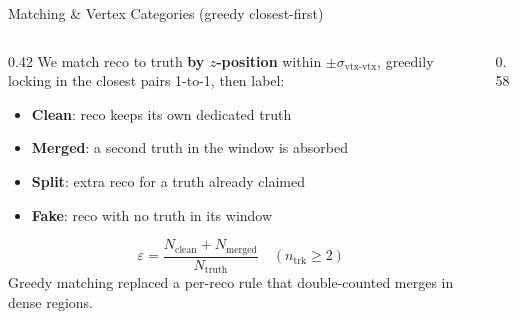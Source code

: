 \documentclass[xcolor=table,aspectratio=169]{beamer}
\newcommand{\ntrk}{\ensuremath{n_\mathrm{trk}}}
\begin{document}
\begin{frame}{Matching \& Vertex Categories (greedy closest-first)}
    \begin{columns}[c]
        \begin{column}{0.42\linewidth}
            \footnotesize
            We match reco to truth \textbf{by $z$-position} within $\pm\sigma_{\text{vtx-vtx}}$,
            greedily locking in the closest pairs 1-to-1, then label:
            \begin{itemize}\setlength\itemsep{0.35em}
                \item \textcolor{mygreen!70!black}{\textbf{Clean}}: reco keeps its own dedicated truth
                \item \textcolor{myorange!85!black}{\textbf{Merged}}: a second truth in the window is absorbed
                \item \textcolor{myblue}{\textbf{Split}}: extra reco for a truth already claimed
                \item \textcolor{myred}{\textbf{Fake}}: reco with no truth in its window
            \end{itemize}
            \vspace{0.3em}
            \[\varepsilon = \frac{N_\text{clean}+N_\text{merged}}{N_\text{truth}}\quad(\ntrk\geq2)\]
            \textcolor{black!55}{Greedy matching replaced a per-reco rule that
            double-counted merges in dense regions.}
        \end{column}
        \begin{column}{0.58\linewidth}
            \centering
\end{column}
\end{columns}
\end{frame}
\end{document}
